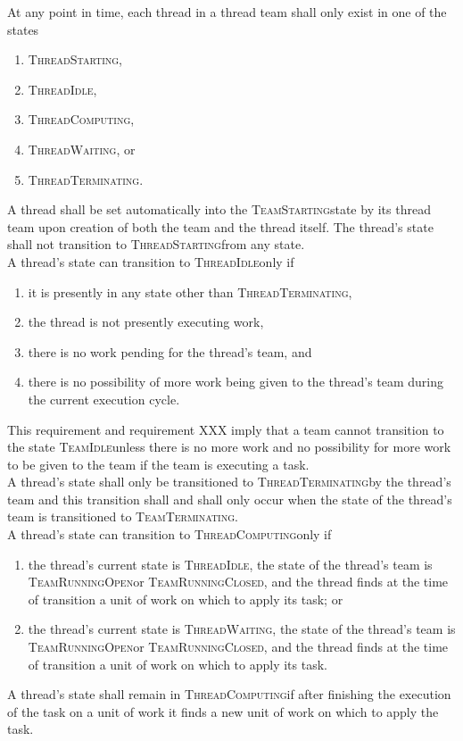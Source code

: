\documentclass{article}
\newcommand{\TeamStarting}      {\textsc{TeamStarting}}
\newcommand{\TeamIdle}          {\textsc{TeamIdle}}
\newcommand{\TeamRunningOpen}   {\textsc{TeamRunningOpen}}
\newcommand{\TeamRunningClosed} {\textsc{TeamRunningClosed}}
\newcommand{\TeamTerminating}   {\textsc{TeamTerminating}}
\newcommand{\ThreadStarting}    {\textsc{ThreadStarting}}
\newcommand{\ThreadIdle}        {\textsc{ThreadIdle}}
\newcommand{\ThreadComputing}   {\textsc{ThreadComputing}}
\newcommand{\ThreadWaiting}     {\textsc{ThreadWaiting}}
\newcommand{\ThreadTerminating} {\textsc{ThreadTerminating}}
\begin{document}
At any point in time, each thread in a thread team shall only exist in one of
the states
\begin{enumerate}
\item{\ThreadStarting,}
\item{\ThreadIdle,}
\item{\ThreadComputing,}
\item{\ThreadWaiting, or}
\item{\ThreadTerminating.}
\end{enumerate}

A thread shall be set automatically into the \TeamStarting state by its thread
team upon creation of both the team and the thread itself.  The thread's state
shall not transition to \ThreadStarting from any state. \\

A thread's state can transition to \ThreadIdle only if
\begin{enumerate}
\item{it is presently in any state other than \ThreadTerminating,}
\item{the thread is not presently executing work,}
\item{there is no work pending for the thread's team, and}
\item{there is no possibility of more work being given to the thread's team
during the current execution cycle.}
\end{enumerate}
This requirement and requirement XXX imply that a team cannot transition to the
state \TeamIdle unless there is no more work and no possibility for more work to
be given to the team if the team is executing a task.\\

A thread's state shall only be transitioned to \ThreadTerminating by the
thread's team and this transition shall and shall only occur when the
state of the thread's team is transitioned to \TeamTerminating.\\

A thread's state can transition to \ThreadComputing only if
\begin{enumerate}
\item{the thread's current state is \ThreadIdle, the state of the thread's team
is \TeamRunningOpen or \TeamRunningClosed, and the thread finds at the time of
transition a unit of work on which to apply its task; or}
\item{the thread's current state is \ThreadWaiting, the state of the thread's
team is \TeamRunningOpen or \TeamRunningClosed, and the thread finds at the time
of transition a unit of work on which to apply its task.}
\end{enumerate}
A thread's state shall remain in \ThreadComputing if after finishing the
execution of the task on a unit of work it finds a new unit of work on which to
apply the task.\\
\end{document}
